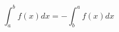 \documentclass{book}
\begin{document}
\setcounter{chapter}{2}

\begin{equation}
\boxed{\int^{b}_{a}f(x)dx=
-\int^{a}_{b}f(x)dx}
\end{equation}
\end{document}
